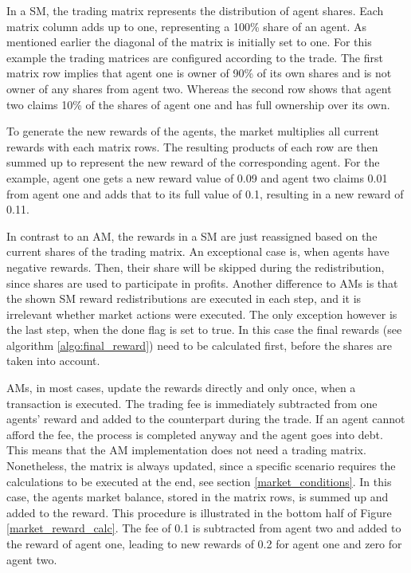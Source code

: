 In a SM, the trading matrix represents the distribution of agent shares. Each matrix column adds up to one, representing a 100\% share of an agent. As mentioned earlier the diagonal of the matrix is initially set to one. For this example the trading matrices are configured according to the trade. The first matrix row implies that agent one is owner of 90\% of its own shares and is not owner of any shares from agent two. Whereas the second row shows that agent two claims 10\% of the shares of agent one and has full ownership over its own.

To generate the new rewards of the agents, the market multiplies all current rewards with each matrix rows. The resulting products of each row are then summed up to represent the new reward of the corresponding agent. For the example, agent one gets a new reward value of 0.09 and agent two claims 0.01 from agent one and adds that to its full value of 0.1, resulting in a new reward of 0.11. 

In contrast to an AM, the rewards in a SM are just reassigned based on the current shares of the trading matrix. An exceptional case is, when agents have negative rewards. Then, their share will be skipped during the redistribution, since shares are used to participate in profits. Another difference to AMs is that the shown SM reward redistributions are executed in each step, and it is irrelevant whether market actions were executed. The only exception however is the last step, when the done flag is set to true. In this case the final rewards (see algorithm \ref{algo:final_reward}) need to be calculated first, before the shares are taken into account.

AMs, in most cases, update the rewards directly and only once, when a transaction is executed. The trading fee is immediately subtracted from one agents' reward and added to the counterpart during the trade. If an agent cannot afford the fee, the process is completed anyway and the agent goes into debt. This means that the AM implementation does not need a trading matrix. Nonetheless, the matrix is always updated, since a specific scenario requires the calculations to be executed at the end, see section \ref{market_conditions}. In this case, the agents market balance, stored in the matrix rows, is summed up and added to the reward. This procedure is illustrated in the bottom half of Figure \ref{market_reward_calc}. The fee of 0.1 is subtracted from agent two and added to the reward of agent one, leading to new rewards of 0.2 for agent one and zero for agent two.

